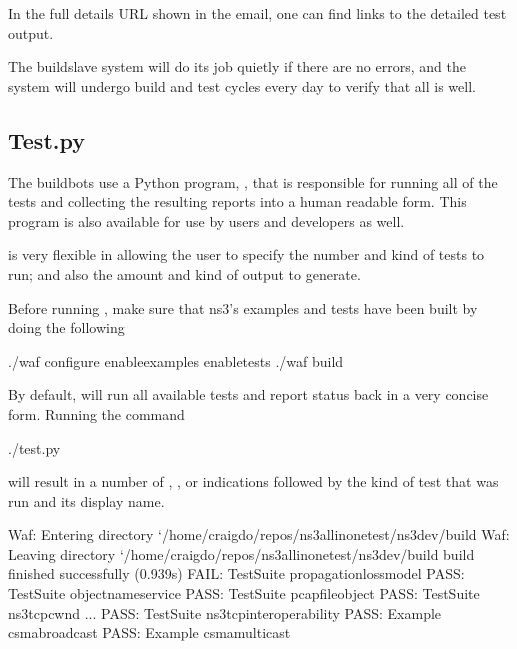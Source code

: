 \documentclass[letterpaper,10pt,english]{sphinxmanual}
\renewcommand{\sphinxcode}[1]{\texttt{\small{#1}}}
\begin{document}
In the full details URL shown in the email, one can find links to the detailed test output.

The buildslave system will do its job quietly if there are no errors, and the
system will undergo build and test cycles every day to verify that all is well.


\subsection{Test.py}
\label{\detokenize{test-framework:test-py}}
The buildbots use a Python program, \sphinxcode{}, that is responsible for
running all of the tests and collecting the resulting reports into a human\sphinxhyphen{}
readable form.  This program is also available for use by users and developers
as well.

\sphinxcode{} is very flexible in allowing the user to specify the number
and kind of tests to run; and also the amount and kind of output to generate.

Before running \sphinxcode{}, make sure that ns3’s examples and tests
have been built by doing the following

\begin{sphinxVerbatim}[commandchars=\\\{\}]
\PYGZdl{} ./waf configure \PYGZhy{}\PYGZhy{}enable\PYGZhy{}examples \PYGZhy{}\PYGZhy{}enable\PYGZhy{}tests
\PYGZdl{} ./waf build
\end{sphinxVerbatim}

By default, \sphinxcode{} will run all available tests and report status
back in a very concise form.  Running the command

\begin{sphinxVerbatim}[commandchars=\\\{\}]
\PYGZdl{} ./test.py
\end{sphinxVerbatim}

will result in a number of \sphinxcode{}, \sphinxcode{}, \sphinxcode{} or \sphinxcode{}
indications followed by the kind of test that was run and its display name.

\begin{sphinxVerbatim}[commandchars=\\\{\}]
Waf: Entering directory `/home/craigdo/repos/ns\PYGZhy{}3\PYGZhy{}allinone\PYGZhy{}test/ns\PYGZhy{}3\PYGZhy{}dev/build\PYGZsq{}
Waf: Leaving directory `/home/craigdo/repos/ns\PYGZhy{}3\PYGZhy{}allinone\PYGZhy{}test/ns\PYGZhy{}3\PYGZhy{}dev/build\PYGZsq{}
\PYGZsq{}build\PYGZsq{} finished successfully (0.939s)
FAIL: TestSuite propagation\PYGZhy{}loss\PYGZhy{}model
PASS: TestSuite object\PYGZhy{}name\PYGZhy{}service
PASS: TestSuite pcap\PYGZhy{}file\PYGZhy{}object
PASS: TestSuite ns3\PYGZhy{}tcp\PYGZhy{}cwnd
...
PASS: TestSuite ns3\PYGZhy{}tcp\PYGZhy{}interoperability
PASS: Example csma\PYGZhy{}broadcast
PASS: Example csma\PYGZhy{}multicast
\end{sphinxVerbatim}
\end{document}
